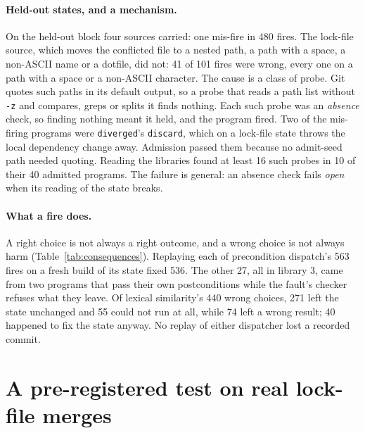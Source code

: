 \documentclass[11pt]{article}
\newcommand{\code}[1]{\texttt{#1}}
\begin{document}
\paragraph{Held-out states, and a mechanism.}
On the held-out block four sources carried: one mis-fire in 480 fires. The lock-file source, which
moves the conflicted file to a nested path, a path with a space, a non-ASCII name or a dotfile,
did not: 41 of 101 fires were wrong, every one on a path with a space or a non-ASCII character.
The cause is a class of probe. Git quotes such paths in its default output, so a probe that
reads a path list without \code{-z} and compares, greps or splits it finds nothing. Each such
probe was an \emph{absence} check, so finding nothing meant it held, and the program fired. Two
of the mis-firing programs were \code{diverged}'s \code{discard}, which on a lock-file state
throws the local dependency change away. Admission passed them because no admit-seed path needed
quoting. Reading the libraries found at least 16 such probes in 10 of their 40 admitted programs.
The failure is general: an absence check fails \emph{open} when its reading of the state breaks.

\begin{table}[t]
\centering
\caption{What each replayed fire left, graded as an episode is: precondition dispatch's fires
(all right choices), and lexical similarity's right and wrong choices at its matched point.}
\label{tab:consequences}
\small
\setlength{\tabcolsep}{4pt}

\end{table}

\paragraph{What a fire does.}
A right choice is not always a right outcome, and a wrong choice is not always harm
(Table~\ref{tab:consequences}). Replaying each of precondition dispatch's 563 fires on a fresh
build of its state fixed 536. The other 27, all in library 3, came from two programs that pass
their own postconditions while the fault's checker refuses what they leave. Of lexical
similarity's 440 wrong choices, 271 left the state unchanged and 55 could not run at all, while
74 left a wrong result; 40 happened to fix the state anyway. No replay of either dispatcher lost a
recorded commit.

\section{A pre-registered test on real lock-file merges}
\label{sec:real}
\end{document}
